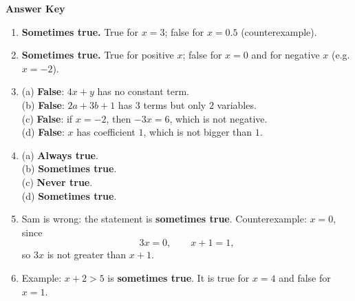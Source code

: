 \documentclass[12pt,a4paper]{article}
\begin{document}
\begin{center}
  {\Large\bfseries Answer Key}
\end{center}

\begin{enumerate}
  \item \textbf{Sometimes true.} True for \(x=3\); false for \(x=0.5\) (counterexample).

  \item \textbf{Sometimes true.} True for positive \(x\); false for \(x=0\) and for negative \(x\) (e.g. \(x=-2\)).

  \item
  (a) \textbf{False}: \(4x+y\) has no constant term.\\
  (b) \textbf{False}: \(2a+3b+1\) has \(3\) terms but only \(2\) variables.\\
  (c) \textbf{False}: if \(x=-2\), then \(-3x=6\), which is not negative.\\
  (d) \textbf{False}: \(x\) has coefficient \(1\), which is not bigger than \(1\).

  \item
  (a) \textbf{Always true}.\\
  (b) \textbf{Sometimes true}.\\
  (c) \textbf{Never true}.\\
  (d) \textbf{Sometimes true}.

  \item Sam is wrong: the statement is \textbf{sometimes true}. Counterexample: \(x=0\), since
  \[
    3x=0,\qquad x+1=1,
  \]
  so \(3x\) is not greater than \(x+1\).

  \item Example: \(x+2>5\) is \textbf{sometimes true}. It is true for \(x=4\) and false for \(x=1\).
\end{enumerate}
\end{document}
